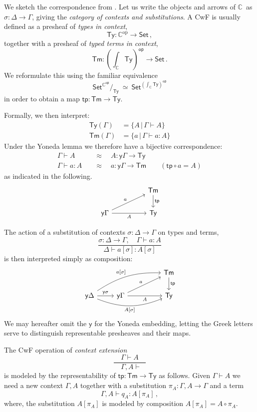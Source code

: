 \documentclass[12pt,reqno]{amsart}
\newcommand{\C}{\ensuremath{\mathbb{C}}}
\newcommand{\op}[1]{\ensuremath{{#1}^{\mathsf{op}}}}
\newcommand{\pshx}[1]{\ensuremath{\mathsf{Set}^{\op{#1}}}}
\newcommand{\Set}{\ensuremath{\mathsf{Set}}}
\newcommand{\y}{\ensuremath{\mathsf{y}}} %
\newcommand{\tp}{\ensuremath{\mathsf{tp}}}
\newcommand{\Tm}{\ensuremath{\mathsf{Tm}}}
\newcommand{\Ty}{\ensuremath{\mathsf{Ty}}}
\renewcommand{\to}{\ensuremath{\rightarrow}}
\newcommand{\G}{\ensuremath{\Gamma}}
\newcommand{\terms}[2]{#1 \vdash #2}
\newcommand{\Gterms}[1]{\terms{\Gamma}{#1}}
\newcommand{\ext}[2]{{#1,#2}}
\theoremstyle{remark}
\theoremstyle{definition}
\begin{document}
We sketch the correspondence from \cite{awodey:NM}.
Let us write the objects and arrows of \C\ as $\sigma : \Delta \to \Gamma$, giving the \emph{category of contexts and substitutions}.
A CwF is usually defined as a presheaf of \emph{types in context}, 
\[
\Ty : \C^{\mathrm{op}}\to \Set\,,
\]
together with a presheaf of \emph{typed terms in context}, 
\[
\Tm : {\textstyle (\int_{\C}\!\Ty)^{\mathsf{op}}\to \Set }\,.
\]
We reformulate this using the familiar equivalence
\[\textstyle
 \pshx{\C}\!/_{\Ty}\ \simeq\ \pshx{(\int_{\C}\Ty)}
\]
in order to obtain a map $\tp :\Tm \to \Ty$.


Formally, we then interpret:
\begin{align*}
 \Ty(\Gamma) &= \{ A \,|\, \Gamma \vdash A\} \\
 \Tm(\Gamma) &= \{ a \,|\, \Gamma \vdash a:A\} 
\end{align*}
Under the Yoneda lemma we therefore have a bijective correspondence:
\begin{align*}
\Gamma\vdash A\quad &\approx\quad A : \y{\Gamma}\to \Ty  \\
\Gterms{a:A}\quad &\approx\quad  a: \y{\Gamma}\to \Tm  \qquad (\tp\circ a = A)
\end{align*}
as indicated in the following.
\[
\begin{tikzcd}
 	&&  {\Tm} \ar[d,"{\tp}"]\\
\y\Gamma \ar[rru, "a"]   \ar[rr ,swap,  "A"]   && {\Ty}
\end{tikzcd}
\]
%

The action of a substitution of contexts $\sigma : \Delta \to \Gamma$ on types and terms,
\[
\frac{\sigma: \Delta \to \Gamma, \quad \Gamma\vdash a:A}{\Delta\vdash a[\sigma] : A[\sigma]}
\]
is then interpreted simply as composition:
\[
\begin{tikzcd}
 	&&&  {\Tm} \ar[d,"{\tp}"]\\
\y{\Delta} \ar[r,  "\y{\sigma}"] \ar[rrru, bend left = 4ex, "{a[\sigma]}"] \ar[rrr, swap, bend right = 5ex, "{A[\sigma]}"] & \y\Gamma \ar[rru, "a"]   \ar[rr ,swap,  "A"]  && {\Ty}
\end{tikzcd}
\]
%
We may hereafter omit the $\y$ for the Yoneda embedding, letting the Greek letters serve to distinguish representable presheaves and their maps.

The CwF operation of \emph{context extension} 
$$\frac{\quad\Gamma\vdash A\quad}{\ \ \ext{\G}{A}\vdash}$$
is modeled by the representability of $\tp : \Tm\to\Ty$ as follows.
%
Given $\Gamma\vdash A$ we need a new context $\ext{\G}{A}$ together with a substitution $\pi_A : \ext{\G}{A} \to \G$ and a term 
\[
\terms{\ext{\G}{A}}{q_A:A[\pi_A]}\,,
\]
where, the substitution $A[\pi_A]$ is modeled by composition $A[\pi_A] = A\circ \pi_A$.
\end{document}
